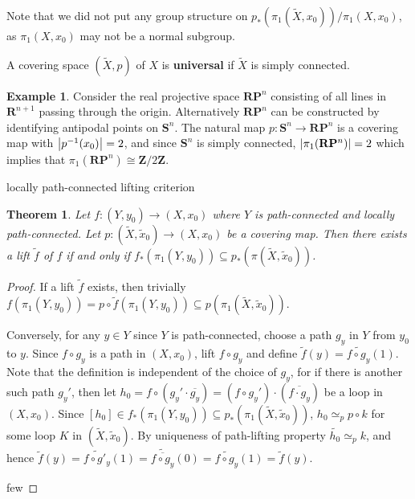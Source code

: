 \documentclass[11pt]{article}
\theoremstyle{definition}
\newtheorem*{example}{Example}
\theoremstyle{plain}
\newtheorem{theorem}{Theorem}[section]
\theoremstyle{remark}
\newcommand{\R}{\mathbf{R}}
\newcommand{\Z}{\mathbf{Z}}
\begin{document}
Note that we did not put any group structure on $p_\ast(\pi_1(\widetilde{X},x_0))/\pi_1(X,x_0)$, as $\pi_1(X,x_0)$ may not be a normal subgroup.\medbreak

A covering space $(\widetilde{X},p)$ of $X$ is \textbf{universal} if $\widetilde{X}$ is simply connected.

\begin{example}
Consider the real projective space $\R\mathbf{P}^n$ consisting of all lines in $\R^{n+1}$ passing through the origin. Alternatively $\R\mathbf{P}^n$ can be constructed by identifying antipodal points on $\mathbf{S}^n$. The natural map $p:\mathbf{S}^n\to\R\mathbf{P}^n$ is a covering map with $\abs{p^{-1}(x_0)}=2$, and since $\mathbf{S}^n$ is simply connected, $\abs{\pi_1(\R\mathbf{P}^n)}=2$ which implies that $\pi_1(\R\mathbf{P}^n)\cong\Z/2\Z$.
\end{example}

locally path-connected
lifting criterion

\begin{theorem}
Let $f:(Y,y_0)\to(X,x_0)$ where $Y$ is path-connected and locally path-connected. Let $p:(\widetilde{X},\widetilde{x}_0)\to(X,x_0)$ be a covering map. Then there exists a lift $\widetilde{f}$ of $f$ if and only if $f_\ast(\pi_1(Y,y_0))\subseteq p_\ast(\pi(\widetilde{X},\widetilde{x}_0))$.
\end{theorem}
\begin{proof}
If a lift $\widetilde{f}$ exists, then trivially $f(\pi_1(Y,y_0))=p\circ\widetilde{f}(\pi_1(Y,y_0))\subseteq p(\pi_1(\widetilde{X},\widetilde{x}_0))$.\medbreak

Conversely, for any $y\in Y$ since $Y$ is path-connected, choose a path $g_y$ in $Y$ from $y_0$ to $y$. Since $f\circ g_y$ is a path in $(X,x_0)$, lift $f\circ g_y$ and define $\widetilde{f}(y)=\widetilde{f\circ g_y}(1)$. Note that the definition is independent of the choice of $g_y$, for if there is another such path $g_y'$, then let $h_0=f\circ(g_y'\cdot\overline{g_y})=(f\circ g_y')\cdot(\overline{f\cdot g_y})$ be a loop in $(X,x_0)$. Since $[h_0]\in f_\ast(\pi_1(Y,y_0))\subseteq p_\ast(\pi_1(\widetilde{X},\widetilde{x}_0))$, $h_0\simeq_pp\circ k$ for some loop $K$ in $(\widetilde{X},\widetilde{x}_0)$. By uniqueness of path-lifting property $\widetilde{h_0}\simeq_pk$, and hence $\widetilde{f}(y)=\widetilde{f\circ g'_y}(1)=\widetilde{\overline{f\circ g_y}}(0)=\widetilde{f\circ g_y}(1)=\widetilde{f}(y)$.\medbreak

few
\end{proof}
\end{document}
